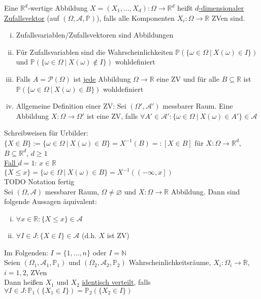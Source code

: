 \documentclass[a4paper]{article}
\newcommand{\ul}{\underline}
\begin{document}
Eine $\mathbb{R}^d$-wertige Abbildung $X=(X_1,\dots,X_d):\Omega\rightarrow\mathbb{R}^d$ heißt \ul{$d$-dimensionaler Zufallsvektor} (auf $(\Omega,\mathcal{A},\mathbb{P})$), falls alle Komponenten $X_i:\Omega\rightarrow\mathbb{R}$ ZVen sind.\\
\begin{enumerate}[i)]
	\item Zufallsvariablen/Zufallsvektoren sind Abbildungen
	\item Für Zufallsvariablen sind die Wahrscheinlichkeiten $\mathbb{P}(\{\omega\in\Omega\ \vert\ X(\omega)\in I\})$ und $\mathbb{P}(\{\omega\in\Omega\ \vert\ X(\omega)\notin I\})$ wohldefiniert
	\item Falls $A=\mathcal{P}(\Omega)$ ist \ul{jede} Abbildung $\Omega\rightarrow\mathbb{R}$ eine ZV und für alle $B\subseteq\mathbb{R}$ ist $\mathbb{P}(\{\omega\in\Omega\ \vert\ X(\omega)\in B\})$ wohldefiniert
	\item Allgemeine Definition einer ZV: Sei $(\Omega',\mathcal{A}')$ messbarer Raum. Eine Abbildung $X:\Omega\rightarrow\Omega'$ ist eine ZV, falls $\forall A'\in \mathcal{A}':\{\omega\in\Omega\ \vert\ X(\omega)\in A'\}\in \mathcal{A}$
\end{enumerate}
Schreibweisen für Urbilder:\\
$\{X\in B\}:=\{\omega\in\Omega\ \vert\ X(\omega)\in B\}=X^{-1}(B)=:\left[X\in B\right]$ für $X:\Omega\rightarrow\mathbb{R}^d$, $B\subseteq\mathbb{R}^d$, $d\geq 1$\\
\ul{Fall $d=1$}: $x\in\mathbb{R}$\\
$\{X\leq x\}=\{\omega\in\Omega\ \vert\ X(\omega)\in B\}=X^{-1}(\left(-\infty,x\right])$\\
TODO Notation fertig\\
Sei $(\Omega,\mathcal{A})$ messbarer Raum, $\Omega\neq\varnothing$ und $X:\Omega\rightarrow\mathbb{R}$ Abbildung. Dann sind folgende Aussagen äquivalent:
\begin{enumerate}[(i)]
	\item $\forall x\in\mathbb{R}:\{X\leq x\}\in\mathcal{A}$
	\item $\forall I\in J:\{X\in I\}\in\mathcal{A}$ (d.h. $X$ ist ZV)
\end{enumerate}
Im Folgenden: $I=\{1,\dots,n\}$ oder $I=\mathbb{N}$\\
Seien $(\Omega_1,\mathcal{A}_1,\mathbb{P}_1)$ und $(\Omega_2,\mathcal{A}_2,\mathbb{P}_2)$ Wahrscheinlichkeitsräume, $X_i:\Omega_i\rightarrow\mathbb{R}$, $i=1,2$, ZVen\\
Dann heißen $X_1$ und $X_2$ \ul{identisch verteilt}, falls $\forall I\in J:\mathbb{P}_1(\{X_1\in I\})=\mathbb{P}_2(\{X_2\in I\})$\\
\end{document}
